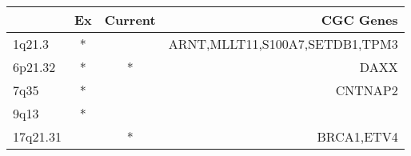 \begin{tabular}{lccr}
\toprule
{} & Ex & Current &                       CGC Genes \\
\midrule
1q21.3   &  * &         &  ARNT,MLLT11,S100A7,SETDB1,TPM3 \\
6p21.32  &  * &       * &                            DAXX \\
7q35     &  * &         &                         CNTNAP2 \\
9q13     &  * &         &                                 \\
17q21.31 &    &       * &                      BRCA1,ETV4 \\
\bottomrule
\end{tabular}
